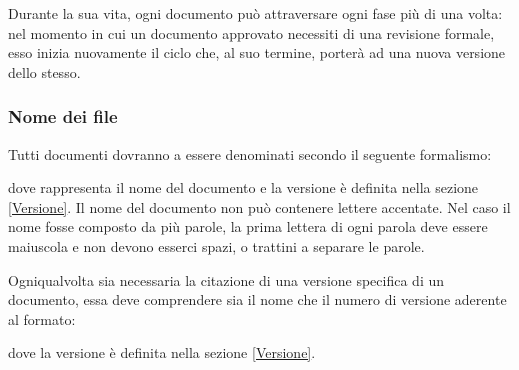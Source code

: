 \documentclass[12pt,a4paper]{article}
\begin{document}
Durante la sua vita, ogni documento può attraversare ogni fase più di una volta: nel momento in cui un documento approvato necessiti di una revisione formale, esso inizia nuovamente il ciclo che, al suo termine, porterà ad una nuova versione dello stesso.

\subsubsection{Nome dei file}
Tutti documenti dovranno a essere denominati secondo il seguente formalismo:
\begin{center}
\end{center}
dove  rappresenta il nome del documento e  la versione è definita nella sezione \ref{Versione}. Il nome del documento non può contenere lettere accentate. Nel caso il nome fosse composto da più parole, la prima lettera di ogni parola deve essere maiuscola e non devono esserci spazi,  o trattini a separare le parole.

Ogniqualvolta sia necessaria la citazione di una versione specifica di un documento, essa deve comprendere sia il nome che il numero di versione aderente al formato:
\begin{center}
\end{center}
dove la versione è definita nella sezione \ref{Versione}.
\end{document}

